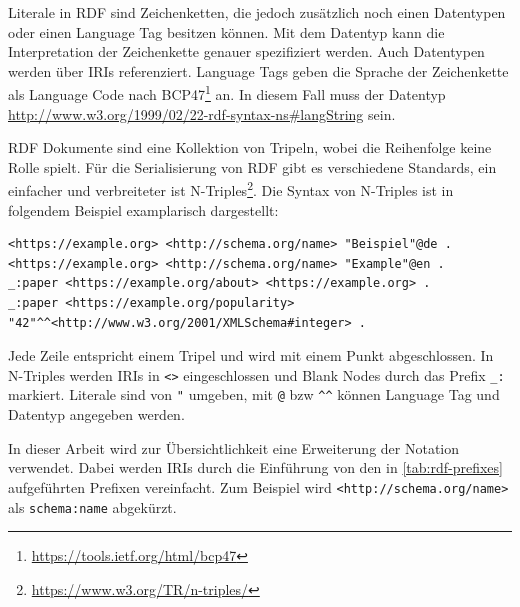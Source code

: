 Literale in RDF sind Zeichenketten, die jedoch zusätzlich noch einen Datentypen oder einen Language Tag besitzen können.
Mit dem Datentyp kann die Interpretation der Zeichenkette genauer spezifiziert werden.
Auch Datentypen werden über IRIs referenziert.
Language Tags geben die Sprache der Zeichenkette als Language Code nach BCP47\footnote{\url{https://tools.ietf.org/html/bcp47}} an. In diesem Fall muss der Datentyp \url{http://www.w3.org/1999/02/22-rdf-syntax-ns#langString} sein.

RDF Dokumente sind eine Kollektion von Tripeln, wobei die Reihenfolge keine Rolle spielt.
Für die Serialisierung von RDF gibt es verschiedene Standards, ein einfacher und verbreiteter ist N-Triples\footnote{\url{https://www.w3.org/TR/n-triples/}}.
Die Syntax von N-Triples ist in folgendem Beispiel examplarisch dargestellt:
\begin{lstlisting}[language=SPARQL, breaklines=true]
<https://example.org> <http://schema.org/name> "Beispiel"@de .
<https://example.org> <http://schema.org/name> "Example"@en .
_:paper <https://example.org/about> <https://example.org> .
_:paper <https://example.org/popularity> "42"^^<http://www.w3.org/2001/XMLSchema#integer> .
\end{lstlisting}
Jede Zeile entspricht einem Tripel und wird mit einem Punkt abgeschlossen.
In N-Triples werden IRIs in \verb|<>| eingeschlossen und Blank Nodes durch das Prefix \verb|_:| markiert.
Literale sind von \verb|"| umgeben, mit \verb|@| bzw \verb|^^| können Language Tag und Datentyp angegeben werden.

In dieser Arbeit wird zur Übersichtlichkeit eine Erweiterung der Notation verwendet.
Dabei werden IRIs durch die Einführung von den in \cref{tab:rdf-prefixes} aufgeführten Prefixen vereinfacht.
Zum Beispiel wird \verb|<http://schema.org/name>| als \verb|schema:name| abgekürzt. 

